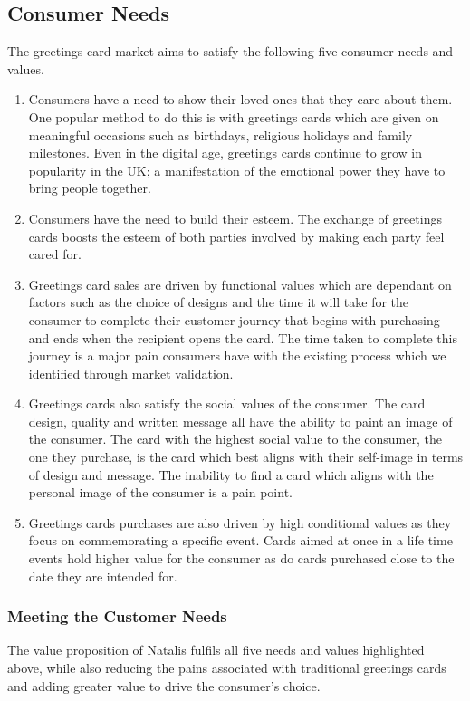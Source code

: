 \documentclass[10pt,a4paper]{article}
\begin{document}
\subsection*{Consumer Needs}
The greetings card market aims to satisfy the following five consumer needs and values.

\begin{enumerate}
	\item Consumers have a need to show their loved ones that they care about them. One popular method to do this is with greetings cards which are given on meaningful occasions such as birthdays, religious holidays and family milestones. Even in the digital age, greetings cards continue to grow in popularity in the UK; a manifestation of the emotional power they have to bring people together.
	\item Consumers have the need to build their esteem. The exchange of greetings cards boosts the esteem of both parties involved by making each party feel cared for.
	\item Greetings card sales are driven by functional values which are dependant on factors such as the choice of designs and the time it will take for the consumer to complete their customer journey that begins with purchasing and ends when the recipient opens the card. The time taken to complete this journey is a major pain consumers have with the existing process which we identified through market validation.
	\item Greetings cards also satisfy the social values of the consumer. The card design, quality and written message all have the ability to paint an image of the consumer. The card with the highest social value to the consumer, the one they purchase, is the card which best aligns with their self-image in terms of design and message. The inability to find a card which aligns with the personal image of the consumer is a pain point.
	\item Greetings cards purchases are also driven by high conditional values as they focus on commemorating a specific event. Cards aimed at once in a life time events hold higher value for the consumer as do cards purchased close to the date they are intended for.
\end{enumerate}

\subsubsection*{Meeting the Customer Needs}
The value proposition of Natalis fulfils all five needs and values highlighted above, while also reducing the pains associated with traditional greetings cards and adding greater value to drive the consumer's choice.
\end{document}
